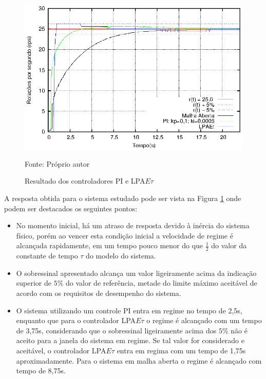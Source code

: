\begin{figure}[!htb]
\centering
\caption{Resultado dos controladores PI e LPA$E\tau$}
\center\includegraphics[scale=1.6]{./imagens/resAcaoPI.eps}
\label{fig:resultadoAcaoPILPAEt}

{\small Fonte: Próprio autor}
\end{figure}









A resposta obtida para o sistema estudado pode ser vista na Figura \ref{fig:resultadoAcaoPILPAEt} onde podem ser destacados os seguintes pontos:

\begin{itemize}
\item No momento inicial, há um atraso de resposta devido à inércia do
  sistema físico, porém ao vencer esta condição inicial a velocidade
  de regime é alcançada rapidamente, em um tempo pouco menor do que $\frac{1}{2}$ do valor da constante de tempo $\tau$ do modelo do sistema.

\item O sobressinal apresentado alcança um valor ligeiramente acima da
  indicação superior de $5\%$ do valor de referência, metade do limite máximo aceitável de acordo com os requisitos de desempenho do sistema.

\item O sistema utilizando um controle PI entra em regime no tempo de
  2,5s, enquanto que para o controlador LPA$E\tau$ o regime é
  alcançado com um tempo de 3,75s, considerando que o sobressinal
  ligeiramente acima dos $5\%$ não é aceito para a janela do sistema
  em regime. Se tal valor for considerado e aceitável, o controlador
  LPA$E\tau$ entra em regima com um tempo de 1,75s aproximadamente.
Para o sistema em malha aberta o regime é alcançado com tempo de 8,75s. 

\end{itemize}


